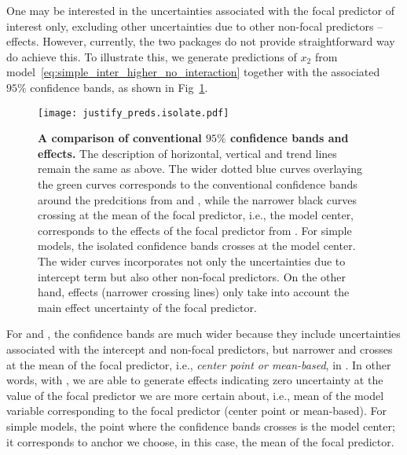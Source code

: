 One may be interested in the uncertainties associated with the focal predictor of interest only, excluding other uncertainties due to other non-focal predictors -- effects. However, currently, the two packages do not provide straightforward way do achieve this. To illustrate this, we generate predictions of $x_2$ from model~\ref{eq:simple_inter_higher_no_interaction} together with the associated $95\%$ confidence bands, as shown in Fig~\ref{fig:justify_ci_plots}. 

\begin{figure}[h]
\begin{center}
\texttt{[image: justify\_preds.isolate.pdf]}
\end{center}
\caption{{\bf A comparison of conventional $95\%$ confidence bands and effects.} The description of horizontal, vertical and trend lines remain the same as above. The wider dotted blue curves overlaying the green curves corresponds to the conventional confidence bands around the predcitions from  and , while the narrower black curves crossing at the mean of the focal predictor, i.e., the model center, corresponds to the effects of the focal predictor from . For simple models, the isolated confidence bands crosses at the model center. The wider curves incorporates not only the uncertainties due to intercept term but also other non-focal predictors. On the other hand, effects (narrower crossing lines) only take into account the main effect uncertainty of the focal predictor.}
\label{fig:justify_ci_plots}
\end{figure}

For  and , the confidence bands are much wider because they include uncertainties associated with the intercept and non-focal predictors, but narrower and crosses at the mean of the focal predictor, i.e., \emph{center point or mean-based}, in . In other words, with , we are able to generate effects indicating zero uncertainty at the value of the focal predictor we are more certain about, i.e., mean of the model variable corresponding to the focal predictor (center point or mean-based). For simple models, the point where the confidence bands crosses is the model center; it corresponds to anchor we choose, in this case, the mean of the focal predictor.

